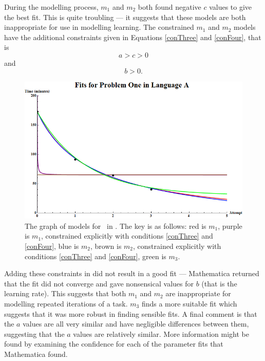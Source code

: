 During the modelling process, $m_1$ and $m_2$ both found negative $c$ values to
give the best fit.
This is quite troubling --- it suggests that these models are both inappropriate
for use in modelling learning.
The constrained $m_1$ and $m_2$ models have the additional constraints given in
Equations \ref{conThree} and \ref{conFour}, that is
\[
  a > c > 0
\]
and
\[
  b > 0.
\]

\begin{figure}[ht!]
\centering
\includegraphics[scale=0.55]{./media/P1LAGraph.png}
\caption{The graph of models for \PO\ in \LA. The key is as follows:
		 red is $m_1$,
		 purple is $m_1$, constrained explicitly with conditions \ref{conThree} and \ref{conFour},
		 blue is $m_2$,
		 brown is $m_2$, constrained explicitly with conditions \ref{conThree} and \ref{conFour},
		 green is $m_3$.
}
\label{figure:P1LA:abc}
\end{figure}

Adding these constraints in did not result in a good fit --- Mathematica
returned that the fit did not converge and gave nonsensical values for $b$ (that
is the learning rate).
This suggests that both $m_1$ and $m_2$ are inappropriate for modelling repeated
iterations of a task.
$m_3$ finds a more suitable fit which suggests that it was more robust in
finding sensible fits.
A final comment is that the $a$ values are all very similar and have negligible
differences between them, suggesting that the $a$ values are relatively similar.
More information might be found by examining the confidence for each of the
parameter fits that Mathematica found.

